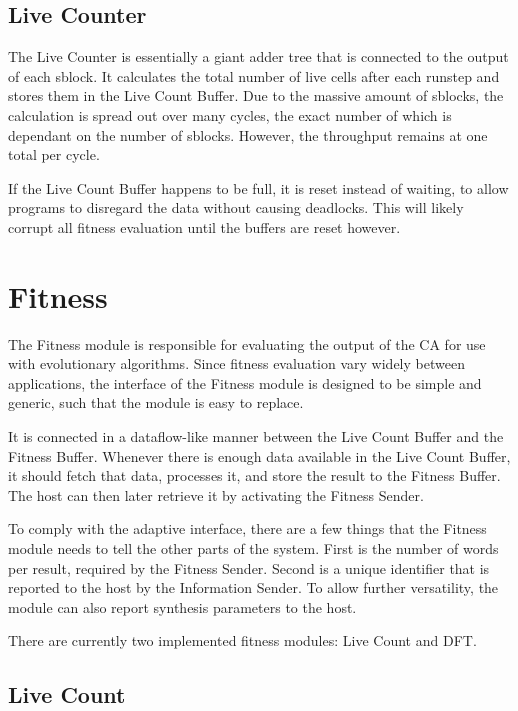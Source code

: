 \subsection{Live Counter}

The Live Counter is essentially a giant adder tree that is connected to the output of each sblock.
It calculates the total number of live cells after each runstep and stores them in the Live Count Buffer.
Due to the massive amount of sblocks, the calculation is spread out over many cycles, the exact number of which is dependant on the number of sblocks.
However, the throughput remains at one total per cycle.

If the Live Count Buffer happens to be full, it is reset instead of waiting, to allow programs to disregard the data without causing deadlocks.
This will likely corrupt all fitness evaluation until the buffers are reset however.


\section{Fitness}
\label{sec:fitness}

The Fitness module is responsible for evaluating the output of the CA for use with evolutionary algorithms.
Since fitness evaluation vary widely between applications, the interface of the Fitness module is designed to be simple and generic, such that the module is easy to replace.

It is connected in a dataflow-like manner between the Live Count Buffer and the Fitness Buffer.
Whenever there is enough data available in the Live Count Buffer, it should fetch that data, processes it, and store the result to the Fitness Buffer.
The host can then later retrieve it by activating the Fitness Sender.

To comply with the adaptive interface, there are a few things that the Fitness module needs to tell the other parts of the system.
First is the number of words per result, required by the Fitness Sender.
Second is a unique identifier that is reported to the host by the Information Sender.
To allow further versatility, the module can also report synthesis parameters to the host.

There are currently two implemented fitness modules: Live Count and DFT.

\subsection{Live Count}

